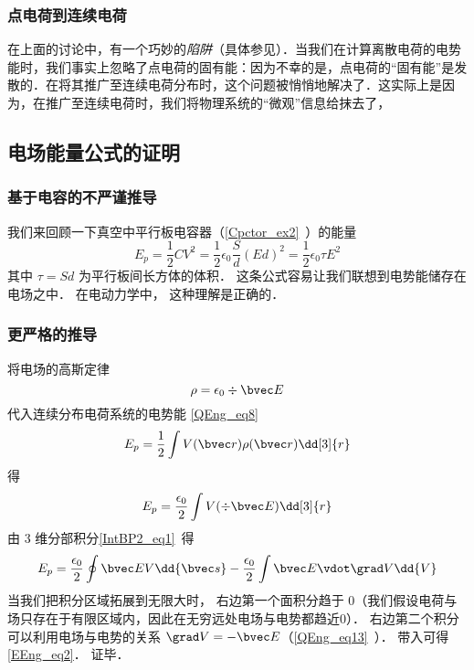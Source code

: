 \subsubsection{点电荷到连续电荷}
在上面的讨论中，有一个巧妙的\textsl{陷阱}（具体参见\cite{GriffE}）．当我们在计算离散电荷的电势能时，我们事实上忽略了点电荷的固有能：因为不幸的是，点电荷的“固有能”是发散的．在将其推广至连续电荷分布时，这个问题被悄悄地解决了．这实际上是因为，在推广至连续电荷时，我们将物理系统的“微观”信息给抹去了，

\subsection{电场能量公式的证明}

\subsubsection{基于电容的不严谨推导}
我们来回顾一下真空中平行板电容器（\autoref{Cpctor_ex2}~）的能量
\begin{equation}
E_p = \frac12 CV^2 = \frac12 \epsilon_0 \frac Sd (Ed)^2 = \frac 12 \epsilon_0 \tau E^2
\end{equation}
其中 $\tau = Sd$ 为平行板间长方体的体积． 这条公式容易让我们联想到电势能储存在电场之中． 在电动力学中， 这种理解是正确的．

\subsubsection{更严格的推导}

将电场的高斯定律
\begin{equation}
\rho = \epsilon_0\div \bvec E
\end{equation}
代入连续分布电荷系统的电势能 \autoref{QEng_eq8}~
\begin{equation}
E_p = \frac 12 \int V(\bvec r) \rho(\bvec r) \dd[3]{r}
\end{equation}
得
\begin{equation}
E_p = \frac{\epsilon_0}2 \int V (\div \bvec E) \dd[3]{r}
\end{equation}
由 3 维分部积分\autoref{IntBP2_eq1}~得
\begin{equation}
E_p = \frac{\epsilon_0}2 \oint \bvec E V \dd{\bvec s} - \frac{\epsilon_0}{2} \int \bvec E \vdot \grad V \dd{V}
\end{equation}
当我们把积分区域拓展到无限大时， 右边第一个面积分趋于 0（我们假设电荷与场只存在于有限区域内，因此在无穷远处电场与电势都趋近$0$）． 右边第二个积分可以利用电场与电势的关系 $\grad V = -\bvec E$（\autoref{QEng_eq13}~）． 带入可得\autoref{EEng_eq2}． 证毕．
